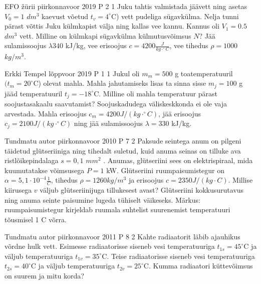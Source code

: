 \documentclass[11pt]{article}
\begin{document}
{%
{EFO žürii} %
{piirkonnavoor} %
{2019} %
{P 2} %
{1} %
{
\ifStatement
Juku tahtis valmistada jäävett ning asetas $V_0 = 1$ $dm^3$ kaevust võetud $t_v = 4^{\circ}$C) vett pudeliga sügavkülma. Nelja tunni pärast võttis Juku külmkapist välja ning kallas vee kannu. Kannus oli $V_1 = 0.5$ $dm^3$ vett. Milline on külmkapi sügavkülma külmutusvõimsus $N$? Jää sulamissoojus $\lambda 340$ kJ/kg, vee erisoojus $c = 4200 \frac{J}{kg \cdot ^{\circ}C}$, vee tihedus $\rho = 1000$ $kg/m^3$.
\fi
}

{Erkki Tempel} %
{lõppvoor} %
{2019} %
{P 1} %
{1} %
{
\ifStatement
Jukul oli $m_m = 500$ g toatemperatuuril $(t_m = 20^{\circ}$C) olevat mahla. Mahla jahutamiseks lisas ta sinna sisse $m_j = 100$ g jääd temperatuuril $t_j = -18^{\circ}$C. Milline oli mahla temperatuur pärast soojustasakaalu saavutamist? Soojuskadudega väliskeskkonda ei ole vaja arvestada. Mahla erisoojus $c_m = 4200 J/(kg \cdot ^{\circ}C)$, jää erisoojus $c_j = 2100 J/(kg \cdot ^{\circ}C)$ ning jää sulamissoojus $\lambda = 330$ kJ/kg.
\fi
}

{Tundmatu autor} %
{piirkonnavoor} %
{2010} %
{P 7} %
{2} %
{
\ifStatement
Paksude seintega anum on pilgeni täidetud glütseriiniga ning tihedalt suletud, kuid anuma seinas on tilluke ava ristlõikepindalaga $s = 0,1$ $mm^2$ . Anumas, glütseriini sees on elektrispiraal, mida kuumutatakse võimsusega $P = 1$ kW. Glütseriini ruumpaisumistegur on $\alpha = 5,1 \cdot 10^{-4} \frac{1}{C}$, tihedus $\rho = 1260 kg/m^3$ ja erisoojus $c = 2350 J/(kg \cdot C)$. Millise kiirusega $v$ väljub glütseriinijuga tillukesest avast? Glütseriini kokkusurutavus ning anuma seinte paisumine lugeda tühiselt väikeseks. Märkus: ruumpaisumistegur kirjeldab ruumala suhtelist suurenemist temperatuuri tõusmisel 1 C võrra.
\fi
}

{Tundmatu autor} %
{piirkonnavoor} %
{2011} %
{P 8} %
{2} %
{
\ifStatement
Kahte radiaatorit läbib ajauhikus võrdne hulk vett. Esimesse radiaatorisse siseneb vesi temperatuuriga $t_{1s} = 45^{\circ}$C ja väljub temperatuuriga $t_{1v} = 35^{\circ}$C. Teise radiaatorisse siseneb vesi temperatuuriga $t_{2s} = 40^{\circ}$C ja väljub temperatuuriga $t_{2v} = 25^{\circ}$C. Kumma radiaatori küttevõimsus on suurem ja mitu korda?
\fi
}

}
\end{document}
